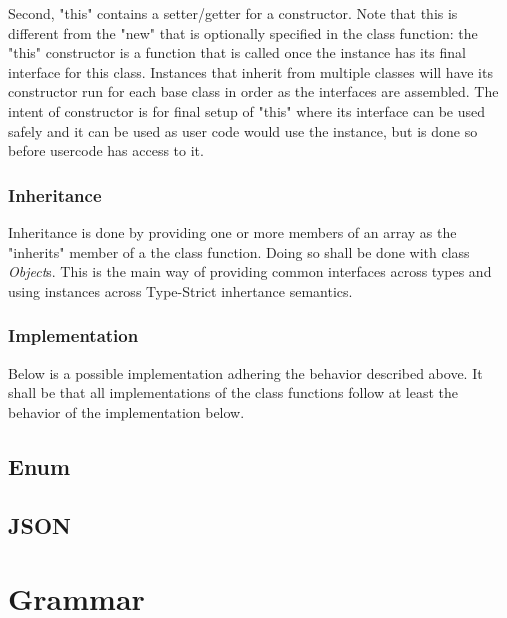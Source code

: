 \documentclass[12pt,letterpaper]{report}
\begin{document}
Second, "this" contains a setter/getter for a constructor. Note that this is different from 
the "new" that is optionally specified in the class function: the "this" constructor is a function 
that is called once the instance has its final interface for this class. Instances 
that inherit from multiple classes will have its constructor run for each base class in order as the interfaces are assembled.
The intent of constructor is for final setup of "this" where its interface can be used safely
and it can be used as user code would use the instance, but is done so before usercode has access 
to it.


\subsection{Inheritance}\label{Inheritance}

Inheritance is done by providing one or more members of an array as the "inherits" member 
of a the class function. Doing so shall be done with class \textit{Object}s. This is the main 
way of providing common interfaces across types and using instances across Type-Strict
inhertance semantics.




\subsection{Implementation}\label{Implementation}

Below is a possible implementation adhering the behavior described above. It shall be that 
all implementations of the class functions follow at least the behavior of the implementation below.




\section{Enum}\label{Enum}
\section{JSON}\label{JSON}
\chapter{Grammar}\label{Grammar}


\end{document}
